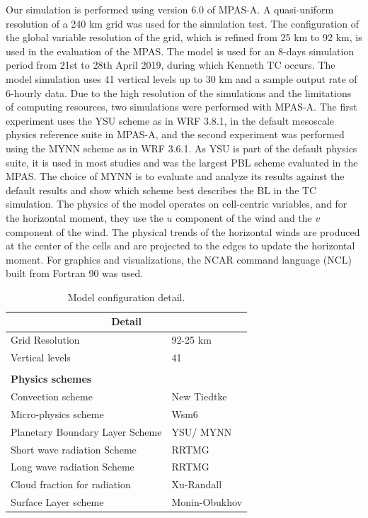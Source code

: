 \documentclass[8pt,a4paper]{article}
\begin{document}
	
	
	Our simulation is performed using version 6.0 of MPAS-A.  A quasi-uniform resolution of a 240 km grid was used for the simulation test. The configuration of the global variable resolution of the grid, which is refined from 25 km to 92 km, is used in the evaluation of the MPAS.  The model is used for an 8-days simulation period from 21st to 28th April 2019, during which Kenneth TC occurs. The model simulation uses 41 vertical levels up to 30 km and a sample output rate of 6-hourly data. Due to the high resolution of the simulations and the limitations of computing resources, two simulations were performed with MPAS-A. The first experiment uses the YSU scheme as in WRF 3.8.1, in the default mesoscale physics reference suite in MPAS-A, and the second experiment was performed using the MYNN scheme as in WRF 3.6.1. As YSU is part of the default physics suite, it is used in most studies and was the largest  PBL scheme evaluated in the MPAS. The choice of MYNN is to evaluate and analyze its results against the default results and show which scheme best describes the BL in the TC simulation. The physics of the model operates on cell-centric variables, and for the horizontal moment, they use the $u$ component of the wind and the $v$ component of the wind. The physical trends of the horizontal winds are produced at the center of the cells and are projected to the edges to update the horizontal moment. For graphics and visualizations, the NCAR command language (NCL) built from Fortran 90 was used.
	
	\begin{table}[H]
		\centering 
		\begin{tabular}{p{7cm}|p{7cm}}
			\hline 
			\multicolumn{2}{c}{\textbf{Detail}}\\\hline
			Grid Resolution &92-25 km\\
			Vertical levels&41\\
			&\\
			\textbf{Physics schemes}& \\
			Convection scheme& New Tiedtke\\
			Micro-physics scheme& Wsm6\\
			Planetary Boundary Layer Scheme& YSU/ MYNN\\
			Short wave radiation Scheme& RRTMG\\
			Long wave radiation Scheme &RRTMG\\
			Cloud fraction for radiation& Xu-Randall\\
			Surface Layer scheme&Monin-Obukhov\\\hline
		\end{tabular}
		\caption{Model configuration detail.}
	\end{table}
	
\end{document}
